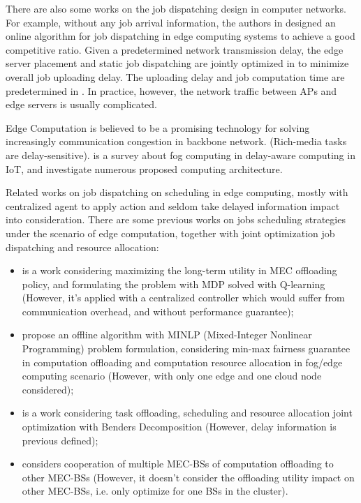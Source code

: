 {    There are also some works on the job dispatching design in computer networks.
    For example, without any job arrival information, the authors in \text{[7]} designed an online algorithm for job dispatching in edge computing systems to achieve a good competitive ratio.
    Given a predetermined network transmission delay, the edge server placement and static job dispatching are jointly optimized in \text{[8]} to minimize overall job uploading delay. The uploading delay and job computation time are predetermined in \text{[7,8]}.
    In practice, however, the network traffic between APs and edge servers is usually complicated.

}

Edge Computation is believed to be a promising technology for solving increasingly communication congestion in backbone network.
(Rich-media tasks are delay-sensitive).
\cite{Naha2018} is a survey about fog computing in delay-aware computing in IoT, and investigate numerous proposed computing architecture.

Related works on job dispatching on scheduling in edge computing, mostly with centralized agent to apply action and seldom take delayed information impact into consideration.
There are some previous works on jobs scheduling strategies under the scenario of edge computation, together with joint optimization job dispatching and resource allocation:
\begin{itemize}
    \item \cite{Zheng2019} is a work considering maximizing the long-term utility in MEC offloading policy, and formulating the problem with MDP solved with Q-learning (However, it's applied with a centralized controller which would suffer from communication overhead, and without performance guarantee);
    \item \cite{Du2018} propose an offline algorithm with MINLP (Mixed-Integer Nonlinear Programming) problem formulation, considering min-max fairness guarantee in computation offloading and computation resource allocation in fog/edge computing scenario (However, with only one edge and one cloud node considered);
    \item \cite{Alameddine2019} is a work considering task offloading, scheduling and resource allocation joint optimization with Benders Decomposition (However, delay information is previous defined);
    \item \cite{Fan2017} considers cooperation of multiple MEC-BSs of computation offloading to other MEC-BSs (However, it doesn't consider the offloading utility impact on other MEC-BSs, i.e. only optimize for one BSs in the cluster).
\end{itemize}


